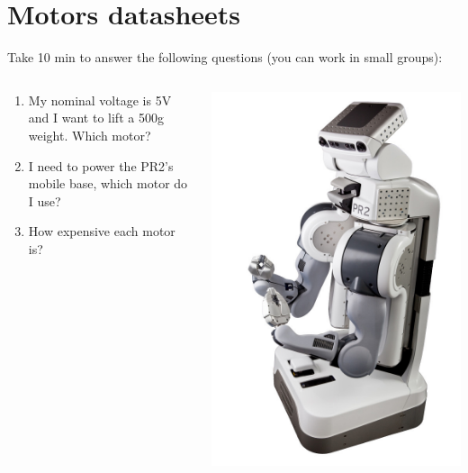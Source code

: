 \documentclass[compress]{beamer}
\begin{document}

\section[Datasheets]{Motors datasheets}

\begin{frame}[plain]{}
    Take 10 min to answer the following questions (you can work in small
    groups):

    \begin{columns}
        \begin{column}{0.5\linewidth}
            \begin{enumerate}
                \item My nominal voltage is 5V and I want to lift a 500g weight.
                    Which motor?
                \item I need to power the PR2's mobile base, which motor do I use?
                \item How expensive each motor is?
            \end{enumerate}
        \end{column}
        \begin{column}{0.5\linewidth}
            \begin{center}
                \includegraphics[width=0.8\linewidth]{pr2}
            \end{center}
        \end{column}
    \end{columns}
\end{frame}
\end{document}
